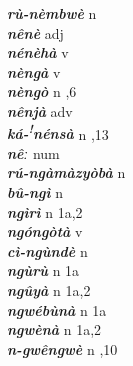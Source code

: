 \begin{multicols}{2}
{{\bfseries\itshape rù-nèmbwè}} \relax  n   \relax  {} \relax   \relax  \\
{{\bfseries\itshape nênè}} \relax  adj  \relax   \relax  {} \relax   \relax  \\
{{\bfseries\itshape nénèhà}} \relax  v  \relax   \relax  {} \relax   \relax  \\
{{\bfseries\itshape nèngà}} \relax  v  \relax   \relax  {} \relax   \relax  \\
{{\bfseries\itshape nèngò}} \relax  n  ,6  \relax   \relax  \\
{{\bfseries\itshape nênjà}} \relax  adv  \relax   \relax  {} \relax   \relax  \\
{{\bfseries\itshape ká-\textsuperscript{!}nénsà}} \relax  n  ,13  \relax   \relax  \\
{{\bfseries\itshape nêː}} \relax  num  \relax   \relax  {} \relax   \relax  \\
{{\bfseries\itshape rú-ngàmàzyòbà}} \relax  n   \relax  {} \relax   \relax  \\
{{\bfseries\itshape bû-ngì}} \relax  n   \relax  {} \relax   \relax  \\
{{\bfseries\itshape ngìrì}} \relax  n  \relax  1a,2  \relax   \relax  \\
{{\bfseries\itshape ngóngòtà}} \relax  v  \relax   \relax  {} \relax   \relax  \\
{{\bfseries\itshape cì-ngùndè}} \relax  n   \relax  {} \relax   \relax  \\
{{\bfseries\itshape ngùrù}} \relax  n  \relax  1a \relax  {} \relax   \relax  \\
{{\bfseries\itshape ngûyà}} \relax  n  \relax  1a,2  \relax   \relax  \\
{{\bfseries\itshape ngwébùnà}} \relax  n  \relax  1a \relax  {} \relax   \relax  \\
{{\bfseries\itshape ngwènà}} \relax  n  \relax  1a,2  \relax   \relax  \\
{{\bfseries\itshape n-gwêngwè}} \relax  n  ,10  \relax   \relax  \\

\end{multicols}
